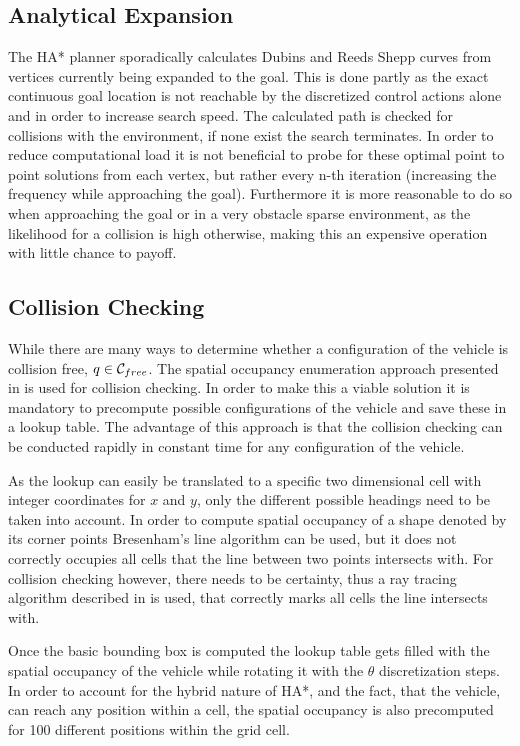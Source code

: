 \subsection{Analytical Expansion}
The HA* planner sporadically calculates Dubins and Reeds Shepp curves from vertices currently being expanded to the goal. This is done partly as the exact continuous goal location is not reachable by the discretized control actions alone and in order to increase search speed. The calculated path is checked for collisions with the environment, if none exist the search terminates. In order to reduce computational load it is not beneficial to probe for these optimal point to point solutions from each vertex, but rather every n-th iteration (increasing the frequency while approaching the goal). Furthermore it is more reasonable to do so when approaching the goal or in a very obstacle sparse environment, as the likelihood for a collision is high otherwise, making this an expensive operation with little chance to payoff.

\subsection{Collision Checking}
While there are many ways to determine whether a configuration of the vehicle is collision free, $q \in \mathcal{C}_{free}$. The spatial occupancy enumeration approach presented in  is used for collision checking. In order to make this a viable solution it is mandatory to precompute possible configurations of the vehicle and save these in a lookup table. The advantage of this approach is that the collision checking can be conducted rapidly in constant time for any configuration of the vehicle.

As the lookup can easily be translated to a specific two dimensional cell with integer coordinates for $x$ and $y$, only the different possible headings need to be taken into account. In order to compute spatial occupancy of a shape denoted by its corner points Bresenham's line algorithm can be used, but it does not correctly occupies all cells that the line between two points intersects with. For collision checking however, there needs to be certainty, thus a ray tracing algorithm described in \cite{Amanatides.2011} is used, that correctly marks all cells the line intersects with.

Once the basic bounding box is computed the lookup table gets filled with the spatial occupancy of the vehicle while rotating it with the $\theta$ discretization steps. In order to account for the hybrid nature of HA*, and the fact, that the vehicle, can reach any position within a cell, the spatial occupancy is also precomputed for 100 different positions within the grid cell.

